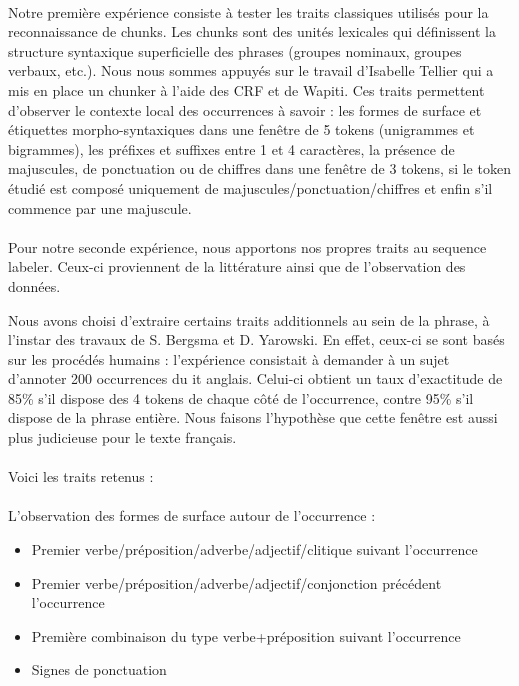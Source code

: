 \documentclass[a4paper,12pt]{article}
\begin{document}
\paragraph{}
Notre première expérience consiste à tester les traits classiques utilisés pour la reconnaissance de chunks. Les chunks sont des unités lexicales qui définissent la structure syntaxique superficielle des phrases (groupes nominaux, groupes verbaux, etc.). Nous nous sommes appuyés sur le travail d'Isabelle Tellier qui a mis en place un chunker à l'aide des CRF et de Wapiti\cite{constant-integrer-taln11}. Ces traits permettent d'observer le contexte local des occurrences à savoir : les formes de surface et étiquettes morpho-syntaxiques dans une fenêtre de 5 tokens (unigrammes et bigrammes), les préfixes et suffixes entre 1 et 4 caractères, la présence de majuscules, de ponctuation ou de chiffres dans une fenêtre de 3 tokens, si le token étudié est composé uniquement de majuscules/ponctuation/chiffres et enfin s'il commence par une majuscule.

\paragraph{}
Pour notre seconde expérience, nous apportons nos propres traits au sequence labeler. Ceux-ci proviennent de la littérature ainsi que de l'observation des données.

Nous avons choisi d'extraire certains traits additionnels au sein de la phrase, à l'instar des travaux de S. Bergsma et D. Yarowski. En effet, ceux-ci se sont basés sur les procédés humains : l'expérience consistait à demander à un sujet d'annoter 200 occurrences du \og{}it\fg{} anglais. Celui-ci obtient un taux d'exactitude de 85\% s'il dispose des 4 tokens de chaque côté de l'occurrence, contre 95\% s'il dispose de la phrase entière. Nous faisons l'hypothèse que cette fenêtre est aussi plus judicieuse pour le texte français.

\paragraph{}
Voici les traits retenus :

\paragraph{}
\textbullet{} L'observation des formes de surface autour de l'occurrence :
 \begin{itemize}
  \item Premier verbe/préposition/adverbe/adjectif/clitique suivant l'occurrence
  \item Premier verbe/préposition/adverbe/adjectif/conjonction précédent l'occurrence
  \item Première combinaison du type verbe+préposition suivant l'occurrence
  \item Signes de ponctuation
 \end{itemize}
 
\end{document}
